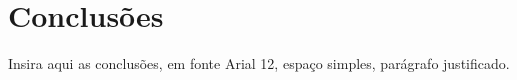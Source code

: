 \section{Conclusões} %

Insira aqui as conclusões, em fonte Arial 12, espaço simples, parágrafo justificado.

